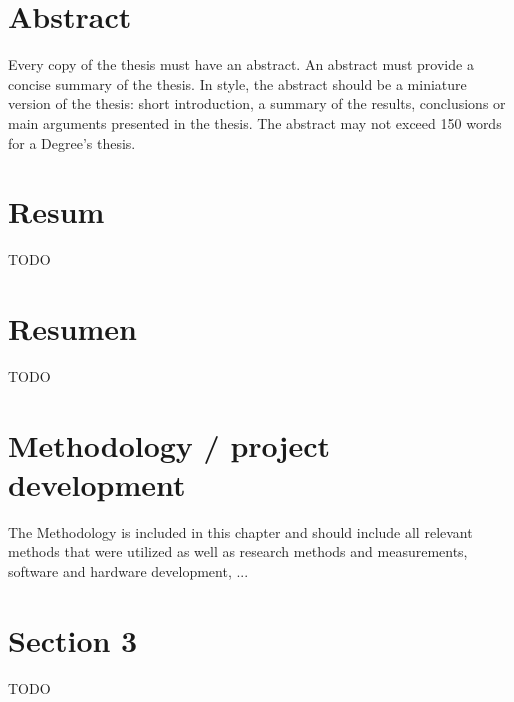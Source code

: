 \documentclass[a4paper,12pt]{article}
\begin{document}
\newpage
\section*{Abstract}

{Every copy of the thesis must have an abstract. An abstract must provide a concise summary of the thesis. In style, the
abstract should be a miniature version of the thesis: short introduction, a summary of the results, conclusions or main
arguments presented in the thesis. The abstract may not exceed 150 words for a Degree’s thesis.}

\newpage
\section*{Resum}

\begin{otherlanguage}{catalan}
TODO
\end{otherlanguage}

\newpage
\section*{Resumen}

\begin{otherlanguage}{spanish}
TODO
\end{otherlanguage}


\newpage
{\hypersetup{linkcolor=black}
\tableofcontents
}

\newpage
{\hypersetup{linkcolor=black}
\listoffigures
\lstlistoflistings
\listoftables
}

\newpage



\newpage


\newpage


\newpage
\section{Methodology / project development}

{The Methodology is included in this chapter and should include all relevant
methods that were utilized as well as
research methods and measurements, software and hardware development, ...}


\newpage
\section{Section 3}
\label{sec:sec3}
TODO
\end{document}
